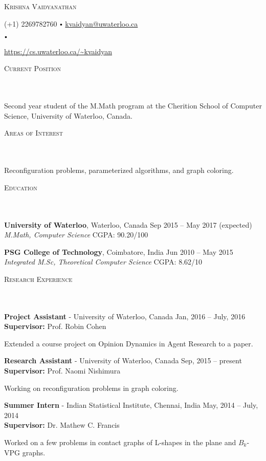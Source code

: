 \documentclass{article}
\newcommand{\contact}[3]{
\vspace*{5pt}
\begin{center}
{\LARGE \scshape {#1}}\\
\vspace{3pt}
#2 
\vspace{2pt}
#3
\end{center}
\vspace*{-8pt}
}
\newcommand{\header}[1]{{
\hspace*{-15pt}\vspace*{6pt} \textsc{#1}} \vspace*{-6pt} 
\lineunder
}
\newcommand{\lineunder}{
\vspace*{-8pt} \\ \hspace*{-18pt} 
\hrulefill \\
}
\newcommand{\content}{
\vspace*{2pt}%
}
\newcommand{\college}[5]{\vspace*{2pt}%
#1 \hfill #2 \\ #3 \hfill #4
\vspace*{5pt}
}
\newcommand{\employer}[4]{{
\vspace*{2pt}%
\textbf{#1} - #2 \hfill #3\\ #4 \vspace*{2pt}}
}
\renewcommand{\labelitemi}{
$\vcenter{\hbox{\tiny$\bullet$}}$\hspace*{3pt}
}
\renewcommand{\labelitemii}{
$\vcenter{\hbox{\tiny$\bullet$}}$\hspace*{-3pt}
}
\newenvironment{bullet-list-minor}{
\begin{list}{\labelitemii}{\setlength\leftmargin{15pt} 
\topsep 0pt \itemsep -2pt}}{\vspace*{4pt}\end{list}
}
\begin{document}
\small
\smallskip
\vspace*{-44pt}

\contact{Krishna Vaidyanathan}{}
{(+1) 2269782760\labelitemi \href{mailto:kvaidyan@uwaterloo.ca}{kvaidyan@uwaterloo.ca}
    \labelitemi
    \url{https://cs.uwaterloo.ca/~kvaidyan}}
\vspace{15pt}
\header{Current Position}
    \content{
Second year student of the M.Math program at the Cherition School of Computer
Science, University of Waterloo, Canada.}

\vspace*{4pt}%
\header{Areas of Interest}
Reconfiguration problems, parameterized algorithms, and graph coloring. 

\vspace*{4pt}%
\header{Education}
    \college{\textbf{University of Waterloo}, Waterloo, Canada}{Sep 2015 -- May 2017 (expected)}
    {\textit{M.Math, Computer Science}}{CGPA: 90.20/100}\\

    \college{\textbf{PSG College of Technology}, Coimbatore, India}{Jun 2010 -- May 2015}
    {\textit{Integrated M.Sc, Theoretical Computer Science}}{CGPA: 8.62/10}\\

\vspace*{4pt}%
\header{Research Experience}
\employer{Project Assistant}{University of Waterloo, Canada}{Jan, 2016 -- July,
    2016}{\textbf{Supervisor:} Prof. Robin Cohen}
\begin{bullet-list-minor}
\item Extended a course project on Opinion Dynamics in Agent Research to a
    paper.
\end{bullet-list-minor}

  \employer{Research Assistant}{University of Waterloo, Canada}{Sep, 2015 --
      present}{\textbf{Supervisor:} Prof. Naomi Nishimura}
\begin{bullet-list-minor}
\item Working on reconfiguration problems in graph coloring. 
\end{bullet-list-minor}

\employer{Summer Intern}{Indian Statistical Institute,
    Chennai, India}{May, 2014 -- July, 2014}{\textbf{Supervisor:} Dr. Mathew C. Francis}
\begin{bullet-list-minor}
\item Worked on a few problems in contact graphs of L-shapes in the plane and $B_{k}$-VPG graphs.
\end{bullet-list-minor}
\end{document}
